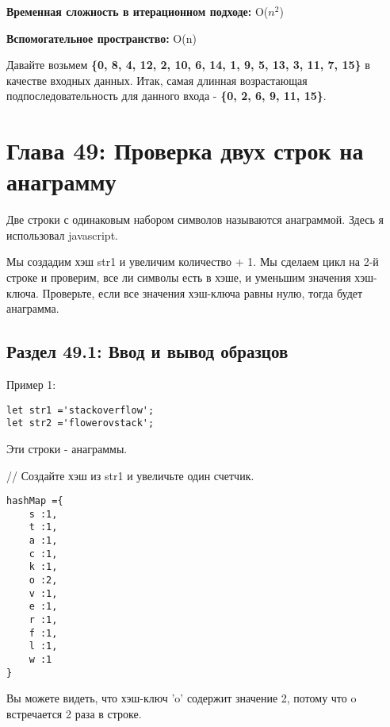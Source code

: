 \textbf{Временная сложность в итерационном подходе:} O($n^2$)
\vspace{\baselineskip}

\textbf{Вспомогательное пространство:} O(n)
\vspace{\baselineskip}

\vspace{\baselineskip}

\vspace{\baselineskip}

Давайте возьмем \textbf{\{0, 8, 4, 12, 2, 10, 6, 14, 1, 9, 5, 13, 3, 11, 7, 15\}} в качестве
входных данных. Итак, самая длинная возрастающая подпоследовательность
для данного входа - \textbf{\{0, 2, 6, 9, 11, 15\}}.

\newpage
\chapter*{Глава 49: Проверка двух строк на анаграмму}
Две строки с одинаковым набором символов называются анаграммой. Здесь
я использовал javascript.
\vspace{\baselineskip}

Мы создадим хэш str1 и увеличим количество + 1. Мы сделаем цикл на 2-й
строке и проверим, все ли символы есть в хэше, и уменьшим значения хэш-
ключа. Проверьте, если все значения хэш-ключа равны нулю, тогда будет
анаграмма.
\section*{Раздел 49.1: Ввод и вывод образцов}
Пример 1:
\vspace{\baselineskip}
\begin{tcolorbox}
\begin{verbatim}     
let str1 ='stackoverflow';
let str2 ='flowerovstack';
\end{verbatim}
\end{tcolorbox}
\vspace{\baselineskip}
Эти строки - анаграммы.
\vspace{\baselineskip}

// Создайте хэш из str1 и увеличьте один счетчик.
\vspace{\baselineskip}
\begin{tcolorbox}
\begin{verbatim}     
hashMap ={
    s :1,    
    t :1,    
    a :1,    
    c :1,   
    k :1,
    o :2,
    v :1,
    e :1,
    r :1,
    f :1,
    l :1, 
    w :1
}
\end{verbatim}
\end{tcolorbox}
\vspace{\baselineskip}
Вы можете видеть, что хэш-ключ 'o' содержит значение 2, потому что o
встречается 2 раза в строке.
\vspace{\baselineskip}

